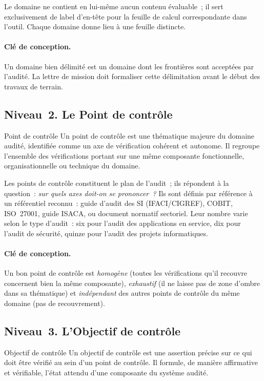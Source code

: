 Le domaine ne contient en lui-même aucun contenu évaluable~; il sert
exclusivement de label d'en-tête pour la feuille de calcul correspondante dans
l'outil. Chaque domaine donne lieu à une feuille distincte.

\paragraph{Clé de conception.}
Un domaine bien délimité est un domaine dont les frontières sont acceptées par
l'audité. La lettre de mission doit formaliser cette délimitation avant le début
des travaux de terrain.

\subsection{Niveau~2. Le Point de contrôle}

\begin{boxdef}{Point de contrôle}
Un point de contrôle est une thématique majeure du domaine audité, identifiée
comme un axe de vérification cohérent et autonome. Il regroupe l'ensemble des
vérifications portant sur une même composante fonctionnelle, organisationnelle
ou technique du domaine.
\end{boxdef}

Les points de contrôle constituent le plan de l'audit~; ils répondent à la
question~: \emph{sur quels axes doit-on se prononcer~?} Ils sont définis par
référence à un référentiel reconnu~: guide d'audit des SI (IFACI/CIGREF), COBIT,
ISO~27001, guide ISACA, ou document normatif sectoriel. Leur nombre varie selon
le type d'audit~: six pour l'audit des applications en service, dix pour
l'audit de sécurité, quinze pour l'audit des projets informatiques.

\paragraph{Clé de conception.}
Un bon point de contrôle est \emph{homogène} (toutes les vérifications qu'il
recouvre concernent bien la même composante), \emph{exhaustif} (il ne laisse
pas de zone d'ombre dans sa thématique) et \emph{indépendant} des autres points
de contrôle du même domaine (pas de recouvrement).

\subsection{Niveau~3. L'Objectif de contrôle}

\begin{boxdef}{Objectif de contrôle}
Un objectif de contrôle est une assertion précise sur ce qui doit être vérifié
au sein d'un point de contrôle. Il formule, de manière affirmative et
vérifiable, l'état attendu d'une composante du système audité.
\end{boxdef}

